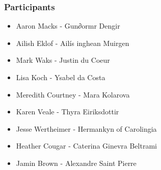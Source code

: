 \documentclass[12pt,letter]{article} %
\begin{document}
\subsubsection*{Participants}
\begin{itemize}
\item Aaron Macks - Gun∂ormr Dengir
\item Ailish Eklof - Ailís inghean Muirgen
\item Mark Waks - Justin du Coeur
\item Lisa Koch - Ysabel da Costa
\item Meredith Courtney - Mara Kolarova
\item Karen Veale - Thyra Eiriksdottir
\item Jesse Wertheimer - Hermankyn of Carolingia
\item Heather Cougar - Caterina Ginevra Beltrami
\item Jamin Brown - Alexandre Saint Pierre
\end{itemize}

\newpage 
\end{document}
